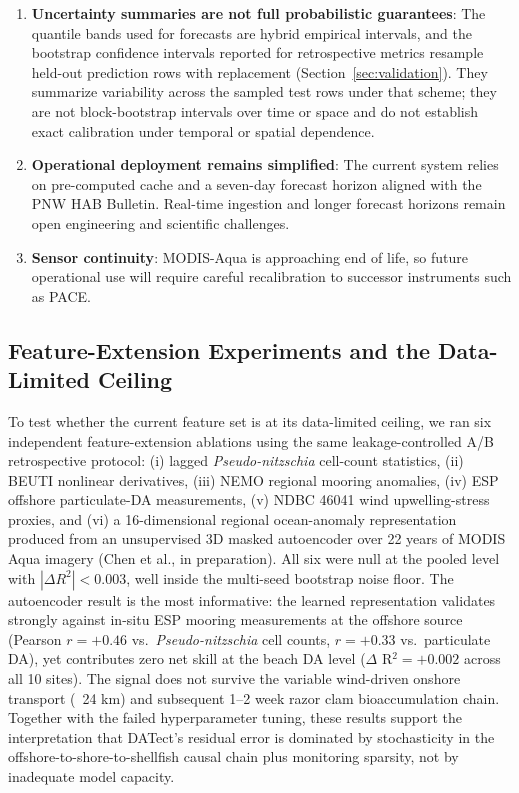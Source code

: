 \documentclass[toxins,article,submit,moreauthors]{Definitions/mdpi}
\begin{document}
\begin{enumerate}[nosep]
    \item \textbf{Uncertainty summaries are not full probabilistic guarantees}: The quantile bands used for forecasts are hybrid empirical intervals, and the bootstrap confidence intervals reported for retrospective metrics resample held-out prediction rows with replacement (Section~\ref{sec:validation}). They summarize variability across the sampled test rows under that scheme; they are not block-bootstrap intervals over time or space and do not establish exact calibration under temporal or spatial dependence.
    \item \textbf{Operational deployment remains simplified}: The current system relies on pre-computed cache and a seven-day forecast horizon aligned with the PNW HAB Bulletin. Real-time ingestion and longer forecast horizons remain open engineering and scientific challenges.
    \item \textbf{Sensor continuity}: MODIS-Aqua is approaching end of life, so future operational use will require careful recalibration to successor instruments such as PACE.
\end{enumerate}

\subsection{Feature-Extension Experiments and the Data-Limited Ceiling}
\label{sec:discussion-feature-extension}

To test whether the current feature set is at its data-limited ceiling, we ran six independent feature-extension ablations using the same leakage-controlled A/B retrospective protocol: (i) lagged \textit{Pseudo-nitzschia} cell-count statistics, (ii) BEUTI nonlinear derivatives, (iii) NEMO regional mooring anomalies, (iv) ESP offshore particulate-DA measurements, (v) NDBC 46041 wind upwelling-stress proxies, and (vi) a 16-dimensional regional ocean-anomaly representation produced from an unsupervised 3D masked autoencoder over 22 years of MODIS Aqua imagery (Chen et al., in preparation). All six were null at the pooled level with $|\Delta R^2| < 0.003$, well inside the multi-seed bootstrap noise floor. The autoencoder result is the most informative: the learned representation validates strongly against in-situ ESP mooring measurements at the offshore source (Pearson $r = +0.46$ vs.\ \textit{Pseudo-nitzschia} cell counts, $r = +0.33$ vs.\ particulate DA), yet contributes zero net skill at the beach DA level (\(\Delta\) R$^2 = +0.002$ across all 10 sites). The signal does not survive the variable wind-driven onshore transport (~24 km) and subsequent 1--2 week razor clam bioaccumulation chain. Together with the failed hyperparameter tuning, these results support the interpretation that DATect's residual error is dominated by stochasticity in the offshore-to-shore-to-shellfish causal chain plus monitoring sparsity, not by inadequate model capacity.
\end{document}
